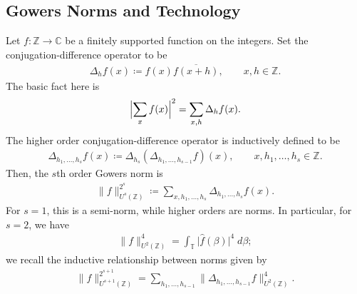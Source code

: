 \documentclass[12pt]{amsart}
\newcommand{\Z}{\mathbb{Z}}
\numberwithin{equation}{section}
\newtheorem{lemma}[theorem]{Lemma}
\theoremstyle{definition}
\begin{document}
\subsection{Gowers Norms and Technology}
\label{sub:gowers_norms}
Let $f \colon \mathbb{Z} \to \mathbb{C} $ be a finitely supported function on the integers. Set the conjugation-difference operator to be 
\begin{align}\label{e:triangle}
  \Delta_h f(x) \coloneqq  f(x) \overline{f(x+h)}, 
  \qquad x,h\in \mathbb{Z} . 
\end{align}
The basic fact here is 
\begin{align} \label{e;double}
\Bigl\lvert \sum_x f(x)\Bigr\rvert ^2 
= 
\sum_{x,h} \Delta_h f(x). 
\end{align}
The higher order conjugation-difference operator is inductively defined to be 
\begin{align}
   \Delta_{h_1,\dots,h_s}f(x) \coloneqq  \Delta_{h_s}(\Delta_{h_1,\dots,h_{s-1}} f)(x), 
    \qquad x,h_1, \ldots, h_s\in \mathbb{Z} . 
\end{align}
Then, the $s$th order Gowers norm is 
\begin{align} \label{e;GowersDef}
    \| f \|_{U^s(\mathbb{Z})}^{2^s} \coloneqq  
    \sum_{x,h_1,\dots,h_s} \Delta_{h_1,\dots,h_s}f(x). 
\end{align}
For $s=1$, this is a semi-norm, while higher orders are norms. In particular, for $s=2$, we have 
\begin{align}  \label{e;U2-ell4}
\lVert f \rVert_{U^2(\mathbb{Z} )} ^{4} 
= \int_{\mathbb{T} } \lvert  \widehat{f} (\beta )\rvert ^{4}\;d \beta;
\end{align}  
we recall the inductive relationship between norms given by 
\begin{align}\label{e:foliate}
\| f \|_{U^{s+1}(\mathbb{Z})}^{2^{s+1}} = \sum_{h_1,\dots,h_{s-1}} \| \Delta_{h_1,\dots,h_{s-1}} f \|_{U^2(\mathbb{Z})}^4.
\end{align}
\end{document}
